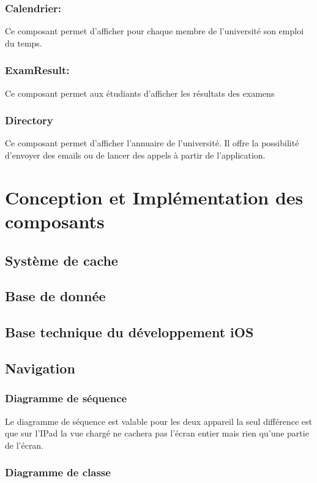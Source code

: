 		\subsubsection*{Calendrier:}
		Ce composant permet d'afficher pour chaque membre de l'université son emploi du temps. 
		\subsubsection*{ExamResult:}
		Ce composant permet aux étudiants d'afficher les résultats des examens
		\subsubsection*{Directory}
		Ce composant permet d'afficher l'annuaire de l'université. Il offre la possibilité d'envoyer des emails ou de lancer des appels à partir de l'application.




\section{Conception et Implémentation des composants}
	\subsection{Système de cache \label{sCache} }
	\subsection{Base de donnée} 
	\subsection{Base technique du développement iOS}
	\subsection{Navigation}
		\subsubsection*{Diagramme de séquence}
			Le diagramme de séquence est valable pour les deux appareil la seul différence est que sur l'IPad la vue chargé  ne cachera pas l'écran entier mais rien qu'une partie de l'écran.
		\subsubsection*{Diagramme de classe}
